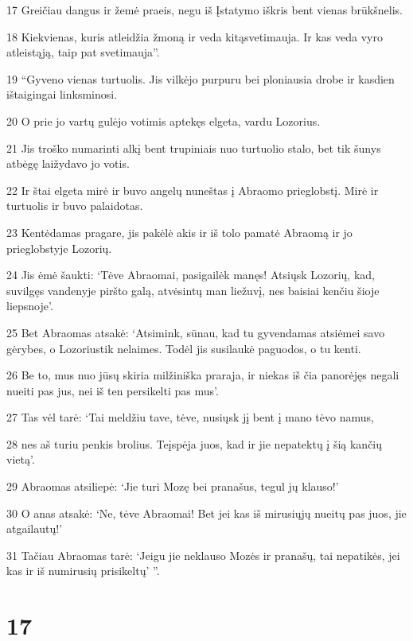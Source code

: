 \par 17 Greičiau dangus ir žemė praeis, negu iš Įstatymo iškris bent vienas brūkšnelis. 
\par 18 Kiekvienas, kuris atleidžia žmoną ir veda kitą­svetimauja. Ir kas veda vyro atleistąją, taip pat svetimauja”. 
\par 19 “Gyveno vienas turtuolis. Jis vilkėjo purpuru bei ploniausia drobe ir kasdien ištaigingai linksminosi. 
\par 20 O prie jo vartų gulėjo votimis aptekęs elgeta, vardu Lozorius. 
\par 21 Jis troško numarinti alkį bent trupiniais nuo turtuolio stalo, bet tik šunys atbėgę laižydavo jo votis. 
\par 22 Ir štai elgeta mirė ir buvo angelų nuneštas į Abraomo prieglobstį. Mirė ir turtuolis ir buvo palaidotas. 
\par 23 Kentėdamas pragare, jis pakėlė akis ir iš tolo pamatė Abraomą ir jo prieglobstyje Lozorių. 
\par 24 Jis ėmė šaukti: ‘Tėve Abraomai, pasigailėk manęs! Atsiųsk Lozorių, kad, suvilgęs vandenyje piršto galą, atvėsintų man liežuvį, nes baisiai kenčiu šioje liepsnoje’. 
\par 25 Bet Abraomas atsakė: ‘Atsimink, sūnau, kad tu gyvendamas atsiėmei savo gėrybes, o Lozorius­tik nelaimes. Todėl jis susilaukė paguodos, o tu kenti. 
\par 26 Be to, mus nuo jūsų skiria milžiniška praraja, ir niekas iš čia panorėjęs negali nueiti pas jus, nei iš ten persikelti pas mus’. 
\par 27 Tas vėl tarė: ‘Tai meldžiu tave, tėve, nusiųsk jį bent į mano tėvo namus, 
\par 28 nes aš turiu penkis brolius. Teįspėja juos, kad ir jie nepatektų į šią kančių vietą’. 
\par 29 Abraomas atsiliepė: ‘Jie turi Mozę bei pranašus, tegul jų klauso!’ 
\par 30 O anas atsakė: ‘Ne, tėve Abraomai! Bet jei kas iš mirusiųjų nueitų pas juos, jie atgailautų!’ 
\par 31 Tačiau Abraomas tarė: ‘Jeigu jie neklauso Mozės ir pranašų, tai nepatikės, jei kas ir iš numirusių prisikeltų’ ”.



\chapter{17}


